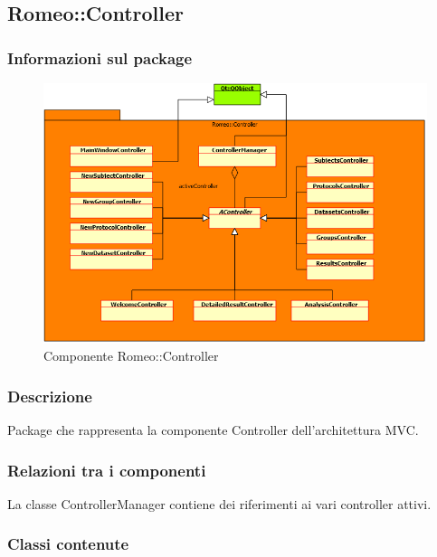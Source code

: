 
	\subsection{Romeo::Controller}
	\label{romeo::controller}
	\subsubsection{Informazioni sul package}
	\label{info_controller}
	\begin{figure}[!h]
		\centering
		\includegraphics[width=1.1\linewidth]{./Content/Immagini/Romeo__Controller.png}
		\caption{Componente Romeo::Controller}
		\label{comp_controller}
	\end{figure}
	\subsubsection{Descrizione}
	\label{descr_controller}
	Package\glossario{} che rappresenta la componente Controller dell'architettura MVC\glossario{}.
	\subsubsection{Relazioni tra i componenti}
	La classe ControllerManager contiene dei riferimenti ai vari controller attivi.
	\subsubsection{Classi contenute}
